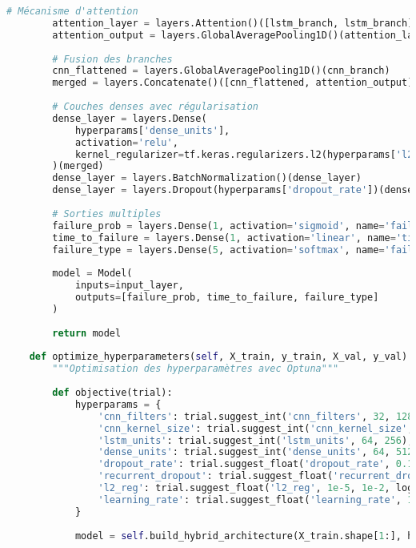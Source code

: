 \documentclass[12pt,a4paper]{report}
\begin{document}
\begin{lstlisting}[language=Python, caption=Modèle de maintenance prédictive avancé]
        # Mécanisme d'attention
        attention_layer = layers.Attention()([lstm_branch, lstm_branch])
        attention_output = layers.GlobalAveragePooling1D()(attention_layer)
        
        # Fusion des branches
        cnn_flattened = layers.GlobalAveragePooling1D()(cnn_branch)
        merged = layers.Concatenate()([cnn_flattened, attention_output])
        
        # Couches denses avec régularisation
        dense_layer = layers.Dense(
            hyperparams['dense_units'],
            activation='relu',
            kernel_regularizer=tf.keras.regularizers.l2(hyperparams['l2_reg'])
        )(merged)
        dense_layer = layers.BatchNormalization()(dense_layer)
        dense_layer = layers.Dropout(hyperparams['dropout_rate'])(dense_layer)
        
        # Sorties multiples
        failure_prob = layers.Dense(1, activation='sigmoid', name='failure_probability')(dense_layer)
        time_to_failure = layers.Dense(1, activation='linear', name='time_to_failure')(dense_layer)
        failure_type = layers.Dense(5, activation='softmax', name='failure_type')(dense_layer)
        
        model = Model(
            inputs=input_layer,
            outputs=[failure_prob, time_to_failure, failure_type]
        )
        
        return model
    
    def optimize_hyperparameters(self, X_train, y_train, X_val, y_val):
        """Optimisation des hyperparamètres avec Optuna"""
        
        def objective(trial):
            hyperparams = {
                'cnn_filters': trial.suggest_int('cnn_filters', 32, 128),
                'cnn_kernel_size': trial.suggest_int('cnn_kernel_size', 3, 7),
                'lstm_units': trial.suggest_int('lstm_units', 64, 256),
                'dense_units': trial.suggest_int('dense_units', 64, 512),
                'dropout_rate': trial.suggest_float('dropout_rate', 0.1, 0.5),
                'recurrent_dropout': trial.suggest_float('recurrent_dropout', 0.1, 0.5),
                'l2_reg': trial.suggest_float('l2_reg', 1e-5, 1e-2, log=True),
                'learning_rate': trial.suggest_float('learning_rate', 1e-4, 1e-2, log=True)
            }
            
            model = self.build_hybrid_architecture(X_train.shape[1:], hyperparams)
            

\end{lstlisting}
\end{document}
